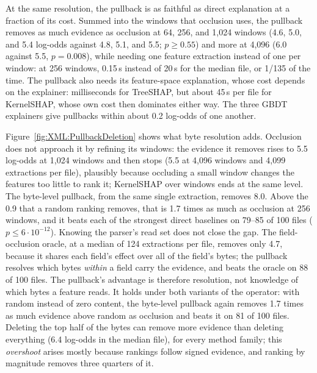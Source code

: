 

At the same resolution, the pullback is as faithful as direct explanation at a fraction of its cost. Summed into the
windows that occlusion uses, the pullback removes as much evidence as occlusion at 64, 256, and 1{,}024 windows (4.6,
5.0, and 5.4 log-odds against 4.8, 5.1, and 5.5; $p \geq 0.55$) and more at 4{,}096 (6.0 against 5.5, $p = 0.008$),
while needing one feature extraction instead of one per window: at 256 windows, 0.15\,s instead of 20\,s for the median file, or 1/135 of the time. The
pullback also needs its
feature-space explanation, whose cost depends on the explainer: milliseconds for TreeSHAP, but about 45\,s per file for
KernelSHAP, whose own cost then dominates either way. The three GBDT explainers give pullbacks within about 0.2
log-odds of one another.

Figure~\ref{fig:XML:PullbackDeletion} shows what byte resolution adds. Occlusion does not approach it by refining its
windows: the evidence it removes rises to 5.5 log-odds at 1{,}024 windows and then stops (5.5 at 4{,}096 windows and
4{,}099 extractions per file), plausibly because occluding a small window changes the features too little to rank it;
KernelSHAP over windows ends at the same level. The byte-level pullback, from the same single extraction, removes 8.0.
Above the 0.9 that a random ranking removes, that is 1.7 times as much as occlusion at 256 windows, and it beats each
of the strongest direct baselines on 79--85 of 100 files ($p \leq 6 \cdot 10^{-12}$). Knowing the parser's read set
does not close the gap. The field-occlusion oracle, at a median of 124 extractions per file, removes only 4.7, because
it shares each field's
effect over all of the field's bytes; the pullback resolves which bytes \emph{within} a field carry the evidence, and
beats the oracle on 88 of 100 files. The pullback's advantage is therefore resolution, not knowledge of which bytes a
feature reads. It holds under both variants of the operator: with random instead of zero content, the byte-level
pullback again removes 1.7 times as much evidence above random as occlusion and beats it on 81 of 100 files. Deleting
the top half of the bytes can remove more evidence than deleting everything (6.4 log-odds in the median file), for
every method family; this \emph{overshoot} arises mostly because rankings
follow signed evidence, and ranking by magnitude removes three quarters of it.

